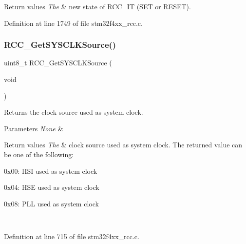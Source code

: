 \begin{DoxyRetVals}{Return values}
{\em The} & new state of R\+C\+C\+\_\+\+IT (S\+ET or R\+E\+S\+ET). \\
\hline
\end{DoxyRetVals}


Definition at line 1749 of file stm32f4xx\+\_\+rcc.\+c.

\mbox{\label{group___r_c_c_gaaeb32311c208b2a980841c9c884a41ea}} 
\subsubsection{\texorpdfstring{R\+C\+C\+\_\+\+Get\+S\+Y\+S\+C\+L\+K\+Source()}{RCC\_GetSYSCLKSource()}}
{\footnotesize\ttfamily uint8\+\_\+t R\+C\+C\+\_\+\+Get\+S\+Y\+S\+C\+L\+K\+Source (\begin{DoxyParamCaption}\item[{void}]{ }\end{DoxyParamCaption})}



Returns the clock source used as system clock. 


\begin{DoxyParams}{Parameters}
{\em None} & \\
\hline
\end{DoxyParams}

\begin{DoxyRetVals}{Return values}
{\em The} & clock source used as system clock. The returned value can be one of the following\+:
\begin{DoxyItemize}
\item 0x00\+: H\+SI used as system clock
\item 0x04\+: H\+SE used as system clock
\item 0x08\+: P\+LL used as system clock 
\end{DoxyItemize}\\
\hline
\end{DoxyRetVals}


Definition at line 715 of file stm32f4xx\+\_\+rcc.\+c.

\mbox{\label{group___r_c_c_ga9d0aec72e236c6cdf3a3a82dfb525491}} 
